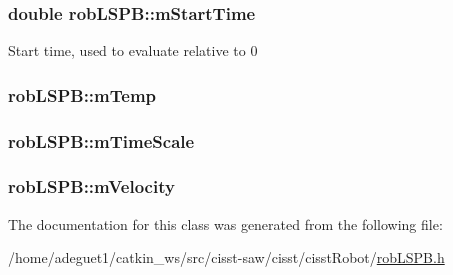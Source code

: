 \hypertarget{classrob_l_s_p_b_a8116b0fac995bf253c0f701c7ab7a00b}{
\subsubsection[{m\-Start\-Time}]{\setlength{\rightskip}{0pt plus 5cm}double rob\-L\-S\-P\-B\-::m\-Start\-Time\hspace{0.3cm}{\ttfamily [protected]}}}\label{classrob_l_s_p_b_a8116b0fac995bf253c0f701c7ab7a00b}
Start time, used to evaluate relative to 0 \hypertarget{classrob_l_s_p_b_a5fdcfe010bf035e87654f2cd15e07d96}{
\subsubsection[{m\-Temp}]{ rob\-L\-S\-P\-B\-::m\-Temp\hspace{0.3cm}{\ttfamily [protected]}}}\label{classrob_l_s_p_b_a5fdcfe010bf035e87654f2cd15e07d96}
\hypertarget{classrob_l_s_p_b_aa239e468d4cd7628eda3dd9a799c1742}{
\subsubsection[{m\-Time\-Scale}]{ rob\-L\-S\-P\-B\-::m\-Time\-Scale\hspace{0.3cm}{\ttfamily [protected]}}}\label{classrob_l_s_p_b_aa239e468d4cd7628eda3dd9a799c1742}
\hypertarget{classrob_l_s_p_b_a57058d6e24b9b68cd3b2327c5c523eb4}{
\subsubsection[{m\-Velocity}]{ rob\-L\-S\-P\-B\-::m\-Velocity\hspace{0.3cm}{\ttfamily [protected]}}}\label{classrob_l_s_p_b_a57058d6e24b9b68cd3b2327c5c523eb4}


The documentation for this class was generated from the following file\-:\begin{DoxyCompactItemize}
\item 
/home/adeguet1/catkin\-\_\-ws/src/cisst-\/saw/cisst/cisst\-Robot/\hyperlink{rob_l_s_p_b_8h}{rob\-L\-S\-P\-B.\-h}\end{DoxyCompactItemize}
